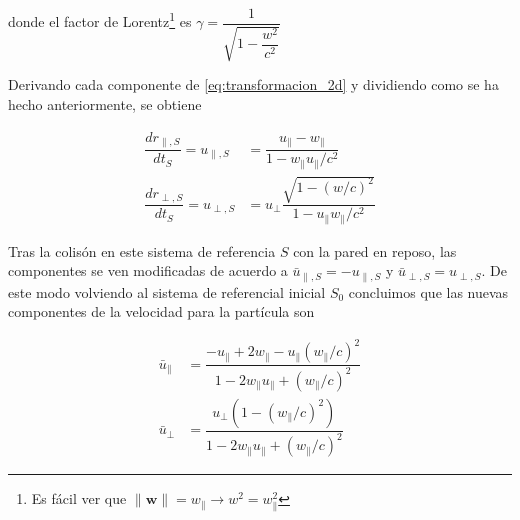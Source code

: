 \documentclass[11pt, spanish]{book}
\begin{document}
donde el factor de Lorentz\footnote{Es fácil ver que \( \lVert \mathbf{w} \rVert = w_\parallel \rightarrow w^2 = w_\parallel^2 \)} es \( \gamma = \dfrac{1}{\sqrt{1 - \dfrac{w^2}{c^2}}} \)

\vspace{6mm}

Derivando cada componente de \ref{eq:transformacion_2d} y dividiendo como se ha hecho anteriormente, se obtiene

\begin{align}
    \dfrac{dr_{\parallel, S}}{dt_S} = u_{\parallel,S} &= \dfrac{u_\parallel - w_\parallel}{1 - w_\parallel u_\parallel / c^2} \\[2mm]
    \dfrac{dr_{\perp, S}}{dt_S} = u_{\perp,S} &= u_\perp\dfrac{\sqrt{1 - {(w/c)}^2}}{1 - u_\parallel w_\parallel / c^2}
\end{align}

Tras la colisón en este sistema de referencia \( S \) con la pared en reposo, las componentes se ven modificadas de acuerdo a \( \bar{u}_{\parallel, S} = -u_{\parallel, S} \) y \( \bar{u}_{\perp, S} = u_{\perp, S} \). De este modo volviendo al sistema de referencial inicial \( S_0 \) concluimos que las nuevas componentes de la velocidad para la partícula son

\begin{align}
    \bar{u}_\parallel &= \dfrac{-u_\parallel + 2w_\parallel - u_\parallel(w_\parallel/c)^2}{1 - 2w_\parallel u_\parallel + (w_\parallel/c)^2} \\[2mm]
    \bar{u}_\perp &= \dfrac{u_\perp\left(1 - (w_\parallel/c)^2\right)}{1 - 2w_\parallel u_\parallel + (w_\parallel/c)^2}
\end{align}
\end{document}
